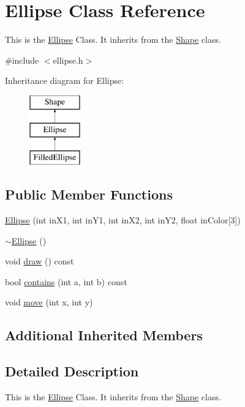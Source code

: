 \hypertarget{classEllipse}{\section{Ellipse Class Reference}
\label{classEllipse}
}


This is the \hyperlink{classEllipse}{Ellipse} Class. It inherits from the \hyperlink{classShape}{Shape} class.  




{\ttfamily \#include $<$ellipse.\-h$>$}

Inheritance diagram for Ellipse\-:\begin{figure}[H]
\begin{center}
\leavevmode
\includegraphics[height=3.000000cm]{classEllipse}
\end{center}
\end{figure}
\subsection*{Public Member Functions}
\begin{DoxyCompactItemize}
\item 
\hyperlink{classEllipse_a03fdd8cc5f0d18626a2679ac4a733485}{Ellipse} (int in\-X1, int in\-Y1, int in\-X2, int in\-Y2, float in\-Color\mbox{[}3\mbox{]})
\item 
\hyperlink{classEllipse_a94271a8a2b16101a52491b7e81e28547}{$\sim$\-Ellipse} ()
\item 
void \hyperlink{classEllipse_a99c72122041b0523dc9227fc3e985179}{draw} () const 
\item 
bool \hyperlink{classEllipse_a31b6310abda060741eb7033636709ce6}{contains} (int a, int b) const 
\item 
void \hyperlink{classEllipse_a7b536dcba1a231980299d2f309ab6fe0}{move} (int x, int y)
\end{DoxyCompactItemize}
\subsection*{Additional Inherited Members}


\subsection{Detailed Description}
This is the \hyperlink{classEllipse}{Ellipse} Class. It inherits from the \hyperlink{classShape}{Shape} class. 

